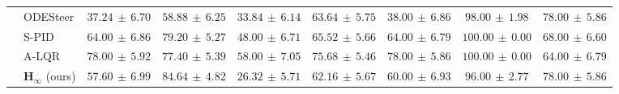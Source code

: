 \begin{table}[!htbp]
{\begin{tabular}{llcccc|ccc}
 & ODESteer & $37.24\,\pm\,6.70$ & $58.88\,\pm\,6.25$ & $33.84\,\pm\,6.14$ & $63.64\,\pm\,5.75$ & $38.00\,\pm\,6.86$ & $98.00\,\pm\,1.98$ & $78.00\,\pm\,5.86$\\
 & S-PID & $64.00\,\pm\,6.86$ & $79.20\,\pm\,5.27$ & $48.00\,\pm\,6.71$ & $65.52\,\pm\,5.66$ & $64.00\,\pm\,6.79$ & $100.00\,\pm\,0.00$ & $68.00\,\pm\,6.60$\\
 & A-LQR & $78.00\,\pm\,5.92$ & $77.40\,\pm\,5.39$ & $58.00\,\pm\,7.05$ & $75.68\,\pm\,5.46$ & $78.00\,\pm\,5.86$ & $100.00\,\pm\,0.00$ & $64.00\,\pm\,6.79$\\
 & $\boldsymbol{H_\infty}$ (ours) & $57.60\,\pm\,6.99$ & $84.64\,\pm\,4.82$ & $26.32\,\pm\,5.71$ & $62.16\,\pm\,5.67$ & $60.00\,\pm\,6.93$ & $96.00\,\pm\,2.77$ & $78.00\,\pm\,5.86$\\
\bottomrule
\end{tabular}%
}
\end{table}
